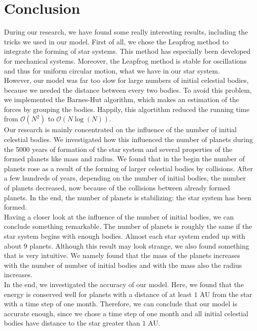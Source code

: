 \section{Conclusion}

During our research, we have found some really interesting results, including the tricks we used in our model.
First of all, we chose the Leapfrog method to integrate the forming of star systems.
This method has especially been developed for mechanical systems.
Moreover, the Leapfrog method is stable for oscillations and thus for uniform circular motion, what we have in our star system.\\

However, our model was far too slow for large numbers of initial celestial bodies, because we needed the distance between every two bodies.
To avoid this problem, we implemented the Barnes-Hut algorithm, which makes an estimation of the forces by grouping the bodies.
Happily, this algortithm reduced the running time from $\mathcal{O}(N^2)$ to $\mathcal{O}(N\log(N))$.\\

Our research is mainly concentrated on the influence of the number of initial celestial bodies.
We investigated how this influenced the number of planets during the 5000 years of formation of the star system and several properties of the formed planets like mass and radius.
We found that in the begin the number of planets rose as a result of the forming of larger celestial bodies by collisions.
After a few hundreds of years, depending on the number of initial bodies, the number of planets decreased, now because of the collisions between already formed planets.
In the end, the number of planets is stabilizing: the star system has been formed.\\

Having a closer look at the influence of the number of initial bodies, we can conclude something remarkable.
The number of planets is roughly the same if the star system begins with enough bodies.
Almost each star system ended up with about $9$ planets.
Although this result may look strange, we also found something that is very intuitive.
We namely found that the mass of the planets increases with the number of number of initial bodies and with the mass also the radius increases.\\

In the end, we investigated the accuracy of our model.
Here, we found that the energy is conserved well for planets with a distance of at least $1$ AU from the star with a time step of one month.
Therefore, we can conclude that our model is accurate enough, since we chose a time step of one month and all initial celestial bodies have distance to the star greater than $1$ AU.





